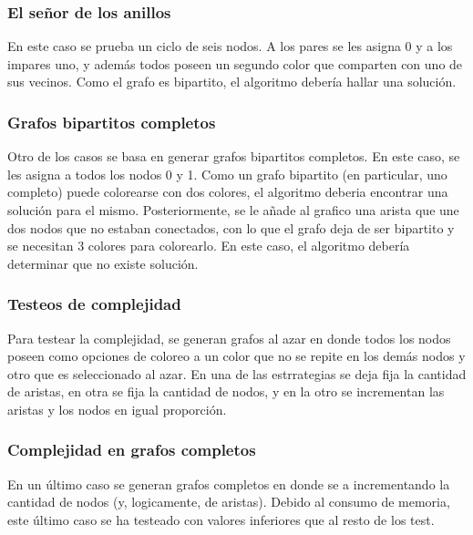 \subsubsection{El señor de los anillos}
En este caso se prueba un ciclo de seis nodos. A los pares se les asigna 0 y a los impares uno, y además todos poseen un segundo color que comparten con uno de sus vecinos. Como el grafo es bipartito, el algoritmo debería hallar una solución.
\subsubsection{Grafos bipartitos completos}
Otro de los casos se basa en generar grafos bipartitos completos. En este caso, se les asigna a todos los nodos 0 y 1. Como un grafo bipartito (en particular, uno completo) puede colorearse con dos colores, el algoritmo deberia encontrar una solución para el mismo. Posteriormente, se le añade al grafico una arista que une dos nodos que no estaban conectados, con lo que el grafo deja de ser bipartito y se necesitan 3 colores para colorearlo. En este caso, el algoritmo debería determinar que no existe solución.

\subsubsection{Testeos de complejidad}
Para testear la complejidad, se generan grafos al azar en donde todos los nodos poseen como opciones de coloreo a un color que no se repite en los demás nodos y otro que es seleccionado al azar. En una de las estrrategias se deja fija la cantidad de aristas, en otra se fija la cantidad de nodos, y en la otro se incrementan las aristas y los nodos en igual proporción.

\subsubsection{Complejidad en grafos completos}
En un último caso se generan grafos completos en donde se a incrementando la cantidad de nodos (y, logicamente, de aristas). Debido al consumo de memoria, este último caso se ha testeado con valores inferiores que al resto de los test.



